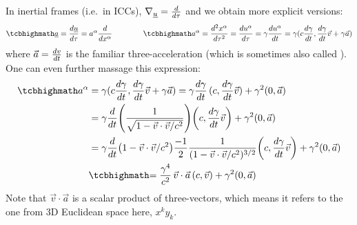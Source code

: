 \documentclass[../relativity_main.tex]{subfiles}
\begin{document}
In inertial frames (i.e.~in ICCs), $\nabla_{\underline{u}} = \dv{\tau}$ and we obtain more explicit versions:
\begin{equation}\label{key}
	\eqbox{
	\fvec{a} = \dv{\fvec{u}}{\tau} = a^\alpha \dv{x^\alpha}
	}
	\qquad \qquad
	\eqbox{
	a^\alpha = \dv[2]{x^\alpha}{\tau} = \dv{u^\alpha}{\tau} = \gamma \dv{u^\alpha}{t} = \gamma (c \dv{\gamma}{t}, \dv{\gamma}{t} \vec{v} + \gamma \vec{a})
	}
\end{equation}
where $\vec{a} = \dv{v}{t}$ is the familiar three-acceleration (which is sometimes also called ). One can even further massage this expression:
\begin{align}
	\eqbox{a^\alpha} &= \gamma (c \dv{\gamma}{t}, \dv{\gamma}{t} \vec{v} + \gamma \vec{a}) = \gamma \dv{\gamma}{t} \, (c , \dv{\gamma}{t} \vec{v}) + \gamma^2 \qty(0, \vec{a})
	\notag\\
	&= \gamma \dv{t} \qty(\frac{1}{\sqrt{1 - \vec{v} \cdot \vec{v} / c^2}}) \qty(c , \dv{\gamma}{t} \vec{v}) +  \gamma^2 \qty(0, \vec{a})
	\notag\\
	&= \gamma \dv{t} \qty(1 - \vec{v} \cdot \vec{v} / c^2) \frac{-1}{2} \frac{1}{(1 - \vec{v} \cdot \vec{v} / c^2)^{3 / 2}} \qty(c , \dv{\gamma}{t} \vec{v}) +  \gamma^2 \qty(0, \vec{a})
	\notag\\
	&\eqbox{
	= \frac{\gamma^4}{c^2} \, \vec{v} \cdot \vec{a} \, \qty(c, \vec{v}) + \gamma^2 \qty(0, \vec{a})
	}
\end{align}
Note that $\vec{v} \cdot \vec{a}$ is a scalar product of three-vectors, which means it refers to the one from 3D Euclidean space here, $x^k y_k$.
\end{document}
